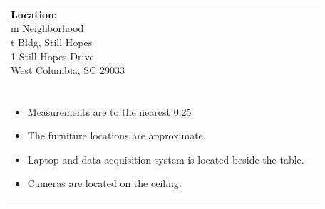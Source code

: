 \documentclass[12pt]{article}
\begin{document}
    \vspace*{\stretch1}  %
    \begin{figure}[H]
        \centering

    \end{figure}
    \vspace*{\stretch1}  %
    
    \vspace*{\fill}  %
    \begin{table}[H]
	\begin{tabular}{l l}
		\makecell[lt]{
			\textbf{Location:}\\
     		m Neighborhood \\
 		    t Bldg, Still Hopes\\
           	1 Still Hopes Drive\\
           	West Columbia, SC 29033\\\\
        }   	
        &	
		\makecell[tp{5in}]{
		\textbf{Notes:}\\
		\vspace{-8mm}  %
		\begin{itemize}
			\setlength\itemsep{-3mm}  %
			\item Measurements are to the nearest \SI{0.25}{\inch}
			\item The furniture locations are approximate.
			\item Laptop and data acquisition system is located beside the table.
			\item Cameras are located on the ceiling.
		\end{itemize}
		}	
			
	\end{tabular}
	\vspace{-8mm} %
\end{table}

    
\end{document}
